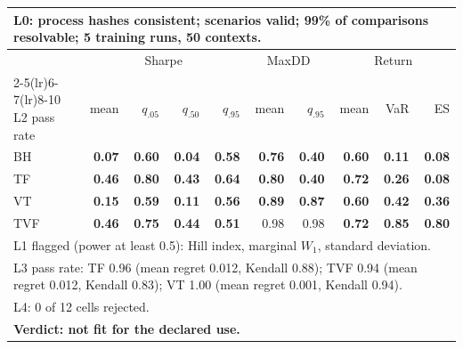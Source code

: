 \begin{tabular}{lrrrrrrrrr}
\toprule
\multicolumn{10}{p{13.5cm}}{L0: process hashes consistent; scenarios valid; 99\% of comparisons resolvable; 5 training runs, 50 contexts.} \\
\midrule
 & \multicolumn{4}{c}{Sharpe} & \multicolumn{2}{c}{MaxDD} & \multicolumn{3}{c}{Return} \\
\cmidrule(lr){2-5}\cmidrule(lr){6-7}\cmidrule(lr){8-10}
L2 pass rate & mean & $q_{.05}$ & $q_{.50}$ & $q_{.95}$ & mean & $q_{.95}$ & mean & VaR & ES \\
\midrule
BH & \textbf{0.07} & \textbf{0.60} & \textbf{0.04} & \textbf{0.58} & \textbf{0.76} & \textbf{0.40} & \textbf{0.60} & \textbf{0.11} & \textbf{0.08} \\
TF & \textbf{0.46} & \textbf{0.80} & \textbf{0.43} & \textbf{0.64} & \textbf{0.80} & \textbf{0.40} & \textbf{0.72} & \textbf{0.26} & \textbf{0.08} \\
VT & \textbf{0.15} & \textbf{0.59} & \textbf{0.11} & \textbf{0.56} & \textbf{0.89} & \textbf{0.87} & \textbf{0.60} & \textbf{0.42} & \textbf{0.36} \\
TVF & \textbf{0.46} & \textbf{0.75} & \textbf{0.44} & \textbf{0.51} & 0.98 & 0.98 & \textbf{0.72} & \textbf{0.85} & \textbf{0.80} \\
\midrule
\multicolumn{10}{p{13.5cm}}{L1 flagged (power at least 0.5): Hill index, marginal $W_1$, standard deviation.} \\
\multicolumn{10}{p{13.5cm}}{L3 pass rate: TF 0.96 (mean regret 0.012, Kendall 0.88); TVF 0.94 (mean regret 0.012, Kendall 0.83); VT 1.00 (mean regret 0.001, Kendall 0.94).} \\
\multicolumn{10}{p{13.5cm}}{L4: 0 of 12 cells rejected.} \\
\multicolumn{10}{p{13.5cm}}{\textbf{Verdict: not fit for the declared use.}} \\
\bottomrule
\end{tabular}

